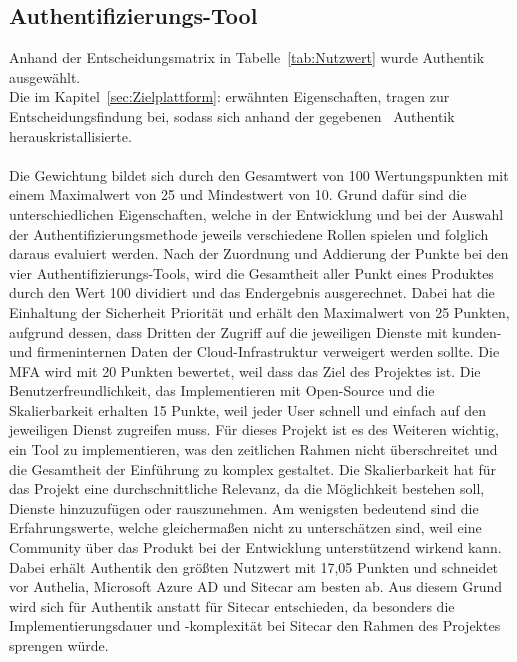 \subsection{Authentifizierungs-Tool}
\label{sec:Authentifizierungs-Tool}
Anhand der Entscheidungsmatrix in Tabelle~\ref{tab:Nutzwert} wurde Authentik ausgewählt. 
\\Die im Kapitel~\ref{sec:Zielplattform}:  erwähnten Eigenschaften, tragen zur 
Entscheidungsfindung bei, sodass sich anhand der gegebenen~ Authentik herauskristallisierte.
\\
\\Die Gewichtung bildet sich durch den Gesamtwert von 100 Wertungspunkten mit einem Maximalwert von 25 und Mindestwert von 10. 
Grund dafür sind die unterschiedlichen Eigenschaften, welche in der Entwicklung und bei der Auswahl der 
Authentifizierungsmethode jeweils verschiedene Rollen spielen und folglich daraus evaluiert werden. Nach der Zuordnung 
und Addierung der Punkte bei den vier Authentifizierungs-Tools, wird die Gesamtheit aller Punkt eines Produktes durch den 
Wert 100 dividiert und das Endergebnis ausgerechnet. Dabei hat die Einhaltung der Sicherheit Priorität und erhält den 
Maximalwert von 25 Punkten, aufgrund dessen, dass Dritten der Zugriff auf die jeweiligen Dienste mit kunden- und 
firmeninternen Daten der Cloud-Infrastruktur verweigert werden sollte. Die \acs{MFA} wird mit 20 Punkten bewertet, weil 
dass das Ziel des Projektes ist. Die Benutzerfreundlichkeit, das Implementieren mit Open-Source und die Skalierbarkeit 
erhalten 15 Punkte, weil jeder User schnell und einfach auf den jeweiligen Dienst zugreifen muss. 
Für dieses Projekt ist es des Weiteren wichtig, ein Tool zu implementieren, was den zeitlichen Rahmen nicht überschreitet und die 
Gesamtheit der Einführung zu komplex gestaltet. Die Skalierbarkeit hat für das Projekt eine durchschnittliche Relevanz, da die 
Möglichkeit bestehen soll, Dienste hinzuzufügen oder rauszunehmen. Am wenigsten bedeutend sind die Erfahrungswerte, welche 
gleichermaßen nicht zu unterschätzen sind, weil eine Community über das Produkt bei der Entwicklung unterstützend wirkend kann.
\\Dabei erhält Authentik den größten Nutzwert mit 17,05 Punkten und schneidet vor Authelia, Microsoft Azure AD und Sitecar am besten ab. 
Aus diesem Grund wird sich für Authentik anstatt für Sitecar entschieden, da besonders die Implementierungsdauer und -komplexität 
bei Sitecar den Rahmen des Projektes sprengen würde.

